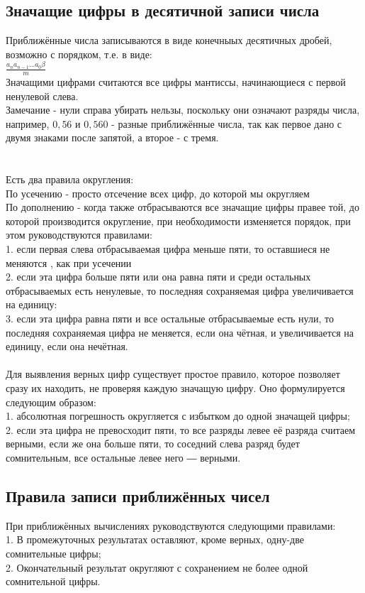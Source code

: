 \documentclass[a4paper]{article}
\begin{document}
\subsection{Значащие цифры в десятичной записи числа}%
\setcounter{subsection}{4}
Приближённые числа записываются в виде конечныых десятичных дробей, возможно с порядком, т.е. в виде:\\
$\frac{a_n a_{n-1} \dots a_0 \beta }{m}$\\
Значащими цифрами считаются все цифры мантиссы, начинающиеся с первой ненулевой слева.\\
Замечание - нули справа убирать нельзы, поскольку они означают разряды числа, например, $0,56$ и $0,560$ - разные приближённые числа, так как первое дано с двумя знаками после запятой, а второе - с тремя.\\\\\\
Есть два правила округления:\\
По усечению - просто отсечение всех цифр, до которой мы округляем\\
По дополнению - когда также отбрасываются все значащие цифры правее той, до которой производится округление, при необходимости изменяется порядок, при этом руководствуются правилами:\\
1. если первая слева отбрасываемая цифра меньше пяти, то оставшиеся не меняются , как при усечении\\
2. если эта цифра больше пяти или она равна пяти и среди остальных отбрасываемых есть ненулевые, то последняя сохраняемая цифра увеличивается на единицу: \\
3. если эта цифра равна пяти и все остальные отбрасываемые есть нули, то последняя сохраняемая цифра не меняется, если она чётная, и увеличивается на единицу, если она нечётная. \\\\
Для выявления верных цифр существует простое правило, которое позволяет сразу их находить, не проверяя каждую значащую цифру. Оно формулируется следующим образом: \\
1. абсолютная погрешность округляется с избытком до одной значащей цифры; \\
2. если эта цифра не превосходит пяти, то все разряды левее её разряда считаем верными, если же она больше пяти, то соседний слева разряд будет сомнительным, все остальные левее него ― верными.\\
\subsection{Правила записи приближённых чисел}%
\setcounter{subsection}{5}
При приближённых вычислениях руководствуются следующими правилами:\\
1. В промежуточных результатах оставляют, кроме верных, одну-две сомнительные цифры;\\
2. Окончательный результат округляют с сохранением не более одной сомнительной цифры.\\
\end{document}
